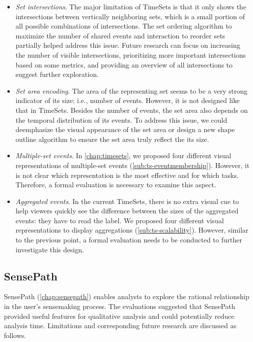 \begin{itemize}
	\item \emph{Set intersections}. The major limitation of TimeSets is that it only shows the intersections between vertically neighboring sets, which is a small portion of all possible combinations of intersections. The set ordering algorithm to maximize the number of shared events and interaction to reorder sets partially helped address this issue. Future research can focus on increasing the number of visible intersections, prioritizing more important intersections based on some metrics, and providing an overview of all intersections to suggest further exploration.
	
	\item \emph{Set area encoding}. The area of the representing set seems to be a very strong indicator of its size; i.e., number of events. However, it is not designed like that in TimeSets. Besides the number of events, the set area also depends on the temporal distribution of its events. To address this issue, we could deemphasize the visual appearance of the set area or design a new shape outline algorithm to ensure the set area truly reflect the its size.
	
	\item \emph{Multiple-set events}. In \autoref{chap:timesets}, we proposed four different visual representations of multiple-set events (\autoref{sub:ts-eventmembership}). However, it is not clear which representation is the most effective and for which tasks. Therefore, a formal evaluation is necessary to examine this aspect.
	
	\item \emph{Aggregated events}. In the current TimeSets, there is no extra visual cue to help viewers quickly see the difference between the sizes of the aggregated events: they have to read the label. We proposed four different visual representations to display aggregations (\autoref{sub:ts-scalability}). However, similar to the previous point, a formal evaluation needs to be conducted to further investigate this design.
\end{itemize}

\subsection{SensePath}
SensePath (\autoref{chap:sensepath}) enables analysts to explore the rational relationship in the user's sensemaking process. The evaluations suggested that SensePath provided useful features for qualitative analysis and could potentially reduce analysis time. Limitations and corresponding future research are discussed as follows.

